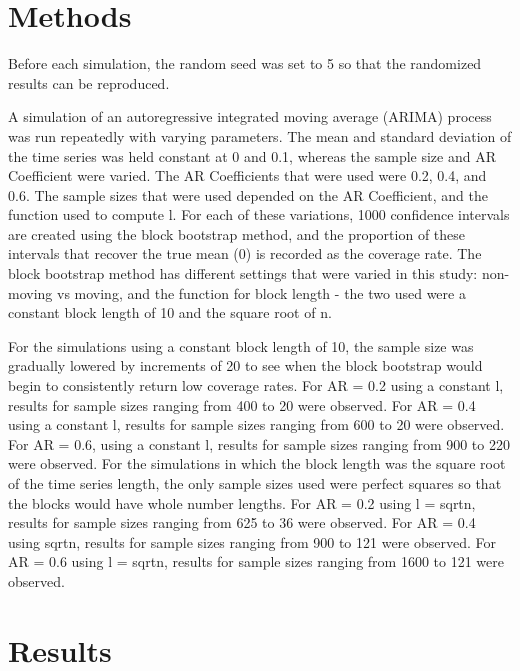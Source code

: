 \documentclass[12pt, letterpaper, titlepage]{article}
\begin{document}
\section{Methods}
\label{sec:methods}

Before each simulation, the random seed was set to 5 so that the randomized results can be 
reproduced. 

A simulation of an autoregressive integrated moving average (ARIMA) process was run 
repeatedly with varying parameters. 
The mean and standard deviation of the time series was held constant at 0 and 0.1, whereas 
the sample size and AR Coefficient
 were varied. The AR Coefficients that were used were 0.2, 0.4, and 0.6. The sample sizes 
 that were used depended on the AR
 Coefficient, and the function used to compute l. For each of these variations, 1000 
 confidence intervals are created using
 the block bootstrap method, and the proportion of these intervals that recover the true 
 mean (0) is recorded as the coverage
 rate. The block bootstrap method has different settings that were varied in this study: 
 non-moving vs moving, 
and the function for block length - the two used were a constant block length of 10 and 
the square root of n.

For the simulations using a constant block length of 10, the sample size was gradually 
lowered by increments of 20 to see when
the block bootstrap would begin to consistently return low coverage rates. For AR = 0.2 
using a constant l, results for
sample sizes ranging from 400 to 20 were observed. For AR = 0.4 using a constant l, 
results for sample sizes ranging from 600
to 20 were observed. For AR = 0.6, using a constant l, results for sample sizes ranging 
from 900 to 220 were observed. For the simulations in which the block length was the 
square root of the time series length, the only sample sizes used were perfect squares so 
that the blocks would have whole number lengths. For AR = 0.2 using l = sqrt{n}, results 
for sample sizes ranging from 625 to 36 were observed. For AR = 0.4 using sqrt{n}, results 
for sample sizes ranging from 900 to 121 were observed. For AR = 0.6 using l = sqrt{n}, 
results for sample sizes ranging from 1600 to 121 were observed. 

\section{Results}
\label{sec:results}
\end{document}
